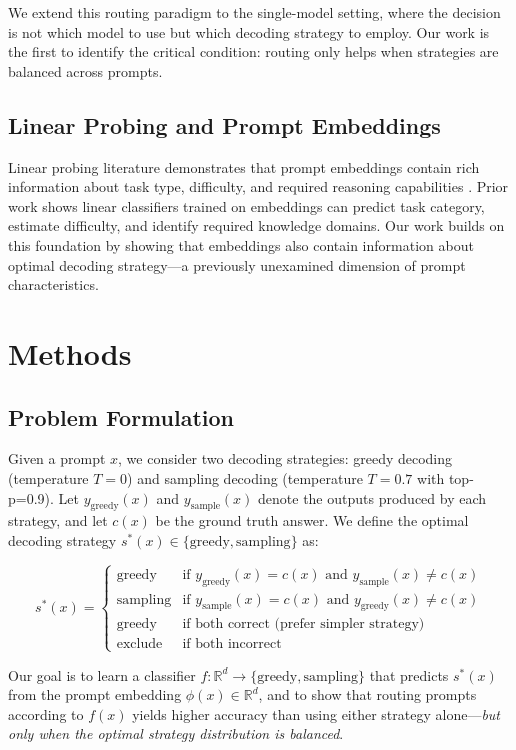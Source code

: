 \documentclass[11pt,letterpaper]{article}
\begin{document}
We extend this routing paradigm to the single-model setting, where the decision is not which model to use but which decoding strategy to employ. Our work is the first to identify the critical condition: routing only helps when strategies are balanced across prompts.

\subsection{Linear Probing and Prompt Embeddings}

Linear probing literature demonstrates that prompt embeddings contain rich information about task type, difficulty, and required reasoning capabilities \cite{Belinkov2019, Tenney2019}. Prior work shows linear classifiers trained on embeddings can predict task category, estimate difficulty, and identify required knowledge domains. Our work builds on this foundation by showing that embeddings also contain information about optimal decoding strategy---a previously unexamined dimension of prompt characteristics.

\section{Methods}

\subsection{Problem Formulation}

Given a prompt $x$, we consider two decoding strategies: greedy decoding (temperature $T=0$) and sampling decoding (temperature $T=0.7$ with top-p=0.9). Let $y_{\text{greedy}}(x)$ and $y_{\text{sample}}(x)$ denote the outputs produced by each strategy, and let $c(x)$ be the ground truth answer. We define the optimal decoding strategy $s^*(x) \in \{\text{greedy}, \text{sampling}\}$ as:

$$s^*(x) = \begin{cases}
\text{greedy} & \text{if } y_{\text{greedy}}(x) = c(x) \text{ and } y_{\text{sample}}(x) \neq c(x) \\
\text{sampling} & \text{if } y_{\text{sample}}(x) = c(x) \text{ and } y_{\text{greedy}}(x) \neq c(x) \\
\text{greedy} & \text{if both correct (prefer simpler strategy)} \\
\text{exclude} & \text{if both incorrect}
\end{cases}$$

Our goal is to learn a classifier $f: \mathbb{R}^d \rightarrow \{\text{greedy}, \text{sampling}\}$ that predicts $s^*(x)$ from the prompt embedding $\phi(x) \in \mathbb{R}^d$, and to show that routing prompts according to $f(x)$ yields higher accuracy than using either strategy alone---\textit{but only when the optimal strategy distribution is balanced}.
\end{document}
